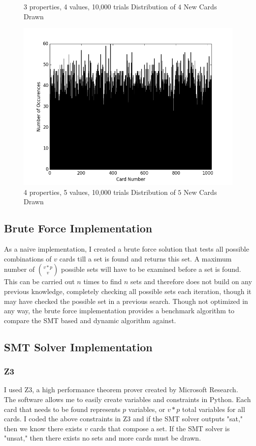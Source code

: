 \documentclass[pageno]{jpaper}
\begin{document}
\begin{figure}[htbb]
\begin{minipage}[b]{0.5\linewidth}
\caption{3 properties, 4 values, 10,000 trials Distribution of $4$ New Cards Drawn}
\label{fig:draw1}
\end{minipage}
\hspace{0.5cm}
\begin{minipage}[b]{0.5\linewidth}
\centering
\includegraphics[width=.75\linewidth]{4p5v10000Draw.png}
\caption{4 properties, 5 values, 10,000 trials Distribution of $5$ New Cards Drawn}
\label{fig:draw2}
\end{minipage}
\end{figure}




\subsection{Brute Force Implementation}

As a naive implementation, I created a brute force solution that tests all possible combinations of $v$ cards till a set is found and returns this set. A maximum number of ${v*p}\choose{v}$ possible sets will have to be examined before a set is found. This can be carried out $n$ times to find $n$ sets and therefore does not build on any previous knowledge, completely checking all possible sets each iteration, though it may have checked the possible set in a previous search. Though not optimized in any way, the brute force implementation provides a benchmark algorithm to compare the SMT based and dynamic algorithm against. 

\subsection{SMT Solver Implementation}


\subsubsection{Z3}
I used Z3, a high performance theorem prover created by Microsoft Research. The software allows me to easily create variables and constraints in Python. Each card that needs to be found represents $p$ variables, or $v*p$ total variables for all cards. I coded the above constraints in Z3 and if the SMT solver outputs "sat," then we know there exists $v$ cards that compose a set. If the SMT solver is "unsat," then there exists no sets and more cards must be drawn.
\end{document}

